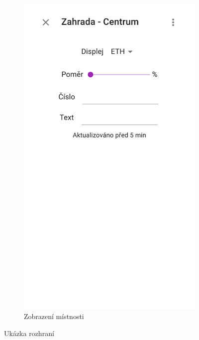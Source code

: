 \documentclass[thesis=B,czech]{FITthesis}[2019/12/23]
\begin{document}
\begin{figure}
\begin{subfigure}{.5\textwidth}
        \includegraphics[width=.7\linewidth]{img/screens/generic.png}
        \caption{Zobrazení místnosti}
    \end{subfigure}
    \caption{Ukázka rozhraní}
\end{figure}
\end{document}
